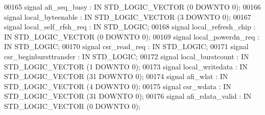 \begin{DoxyCode}
00165         \textcolor{keywordflow}{signal} afi\_seq\_busy : \textcolor{keywordflow}{IN} \textcolor{comment}{STD\_LOGIC\_VECTOR} (\textcolor{vhdllogic}{}\textcolor{vhdllogic}{0} \textcolor{keywordflow}{DOWNTO} \textcolor{vhdllogic}{}\textcolor{vhdllogic}{0});
00166         \textcolor{keywordflow}{signal} local\_byteenable : \textcolor{keywordflow}{IN} \textcolor{comment}{STD\_LOGIC\_VECTOR} (\textcolor{vhdllogic}{}\textcolor{vhdllogic}{3} \textcolor{keywordflow}{DOWNTO} \textcolor{vhdllogic}{}\textcolor{vhdllogic}{0});
00167         \textcolor{keywordflow}{signal} local\_self\_rfsh\_req : \textcolor{keywordflow}{IN} \textcolor{comment}{STD\_LOGIC};
00168         \textcolor{keywordflow}{signal} local\_refresh\_chip : \textcolor{keywordflow}{IN} \textcolor{comment}{STD\_LOGIC\_VECTOR} (\textcolor{vhdllogic}{}\textcolor{vhdllogic}{0} \textcolor{keywordflow}{DOWNTO} \textcolor{vhdllogic}{}\textcolor{vhdllogic}{0});
00169         \textcolor{keywordflow}{signal} local\_powerdn\_req : \textcolor{keywordflow}{IN} \textcolor{comment}{STD\_LOGIC};
00170         \textcolor{keywordflow}{signal} csr\_read\_req : \textcolor{keywordflow}{IN} \textcolor{comment}{STD\_LOGIC};
00171         \textcolor{keywordflow}{signal} csr\_beginbursttransfer : \textcolor{keywordflow}{IN} \textcolor{comment}{STD\_LOGIC};
00172         \textcolor{keywordflow}{signal} local\_burstcount : \textcolor{keywordflow}{IN} \textcolor{comment}{STD\_LOGIC\_VECTOR} (\textcolor{vhdllogic}{}\textcolor{vhdllogic}{1} \textcolor{keywordflow}{DOWNTO} \textcolor{vhdllogic}{}\textcolor{vhdllogic}{0});
00173         \textcolor{keywordflow}{signal} local\_writedata : \textcolor{keywordflow}{IN} \textcolor{comment}{STD\_LOGIC\_VECTOR} (\textcolor{vhdllogic}{}\textcolor{vhdllogic}{31} \textcolor{keywordflow}{DOWNTO} \textcolor{vhdllogic}{}\textcolor{vhdllogic}{0});
00174         \textcolor{keywordflow}{signal} afi\_wlat : \textcolor{keywordflow}{IN} \textcolor{comment}{STD\_LOGIC\_VECTOR} (\textcolor{vhdllogic}{}\textcolor{vhdllogic}{4} \textcolor{keywordflow}{DOWNTO} \textcolor{vhdllogic}{}\textcolor{vhdllogic}{0});
00175         \textcolor{keywordflow}{signal} csr\_wdata : \textcolor{keywordflow}{IN} \textcolor{comment}{STD\_LOGIC\_VECTOR} (\textcolor{vhdllogic}{}\textcolor{vhdllogic}{31} \textcolor{keywordflow}{DOWNTO} \textcolor{vhdllogic}{}\textcolor{vhdllogic}{0});
00176         \textcolor{keywordflow}{signal} afi\_rdata\_valid : \textcolor{keywordflow}{IN} \textcolor{comment}{STD\_LOGIC\_VECTOR} (\textcolor{vhdllogic}{}\textcolor{vhdllogic}{0} \textcolor{keywordflow}{DOWNTO} \textcolor{vhdllogic}{}\textcolor{vhdllogic}{0});

\end{DoxyCode}

